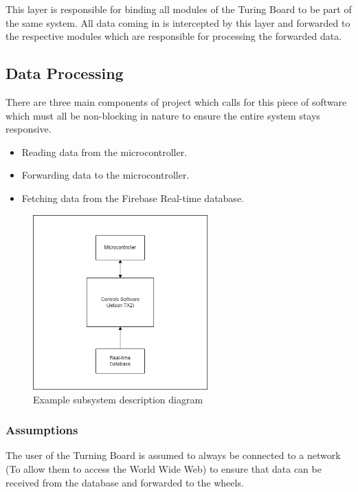 This layer is responsible for binding all modules of the Turing Board to be part of the same system. All data coming in is intercepted by this layer and forwarded to the respective modules which are responsible for processing the forwarded data.

\subsection{Data Processing}
There are three main components of project which calls for this piece of software which must all be non-blocking in nature to ensure the entire system stays responsive.
\begin{itemize}
    \item Reading data from the microcontroller.
    \item Forwarding data to the microcontroller.
    \item Fetching data from the Firebase Real-time database.
\end{itemize}

\begin{figure}[h!]
	\centering
 	\includegraphics[width=0.60\textwidth]{images/Controls Software Subsystem.drawio.png}
 \caption{Example subsystem description diagram}
\end{figure}

\subsubsection{Assumptions}
The user of the Turning Board is assumed to always be connected to a network (To allow them to access the World Wide Web) to ensure that data can be received from the database and forwarded to the wheels.

